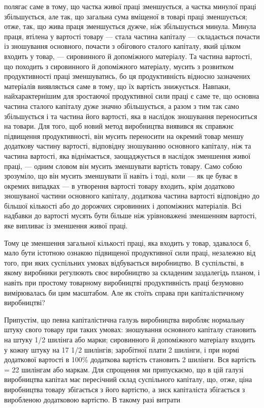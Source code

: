 \parcont{}  %
полягає саме в тому, що частка живої праці зменшується,
а частка минулої праці збільшується, але так, що загальна сума
вміщеної в товарі праці зменшується; отже, так, що жива праця
зменшується дужче, ніж збільшується минула. Минула праця,
втілена у вартості товару — стала частина капіталу — складається
почасти із зношування основного, почасти з обігового
сталого капіталу, який цілком входить у товар, — сировинного
й допоміжного матеріалу. Та частина вартості, що походить
з сировинного й допоміжного матеріалу, мусить з розвитком
продуктивності праці зменшуватись, бо ця продуктивність відносно
зазначених матеріалів виявляється саме в тому, що їх вартість
знижується. Навпаки, найхарактернішим для зростаючої
продуктивної сили праці є саме те, що основна частина сталого
капіталу дуже значно збільшується, а разом з тим так само
збільшується і та частина його вартості, яка в наслідок зношування
переноситься на товари. Для того, щоб новий метод
виробництва виявився як справжнє підвищення продуктивності,
він мусить переносити на окремий товар меншу додаткову частину
вартості, відповідну зношуванню основного капіталу,
ніж та частина вартості, яка віднімається, заощаджується в наслідок
зменшення живої праці, — одним словом він мусить зменшувати
вартість товару. Само собою зрозуміло, що він мусить
зменшувати її навіть і тоді, коли — як це буває в окремих випадках
— в утворення вартості товару входить, крім додатково зношуваної
частини основного капіталу, додаткова частина вартості
відповідно до більшої кількості або до дорожчих сировинних і
допоміжних матеріалів. Всі надбавки до вартості мусять бути
більше ніж урівноважені зменшенням вартості, яке випливає із
зменшення живої праці.

Тому це зменшення загальної кількості праці, яка входить
у товар, здавалося б, мало бути істотною ознакою підвищеної
продуктивної сили праці, незалежно від того, при яких суспільних
умовах відбувається виробництво. В суспільстві, в якому
виробники регулюють своє виробництво за складеним заздалегідь
планом, і навіть при простому товарному виробництві продуктивність
праці безумовно вимірювалась би цим масштабом.
Але як стоїть справа при капіталістичному виробництві?

Припустім, що певна капіталістична галузь виробництва
виробляє нормальну штуку свого товару при таких умовах: зношування
основного капіталу становить на штуку 1/2 шилінга або
марки; сировинного й допоміжного матеріалу входить у кожну
штуку на 17 1/2 шилінгів; заробітної плати 2 шилінги, і при нормі
додаткової вартості в 100\% додаткова вартість становить 2 шилінги.
Вся вартість = 22 шилінгам або маркам. Для спрощення
ми припускаємо, що в цій галузі виробництва капітал має пересічний
склад суспільного капіталу, що, отже, ціна виробництва
товару збігається з його вартістю, а зиск капіталіста збігається
з виробленою додатковою вартістю. В такому разі витрати
\parbreak{}  %
